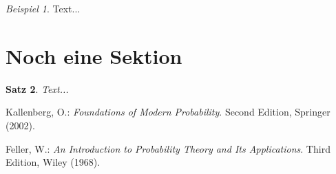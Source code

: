 \documentclass[11pt]{scrreprt}
\theoremstyle{plain}
\newtheorem{satz}{Satz}[chapter]
\theoremstyle{remark}
\newtheorem{bsp}[satz]{Beispiel}
\numberwithin{equation}{chapter}
\numberwithin{satz}{chapter}
\numberwithin{section}{chapter}
\begin{document}
\begin{bsp}
Text...
\end{bsp}

\section{Noch eine Sektion}
\begin{satz}
Text...
\end{satz}


\begin{thebibliography}{100}

Kallenberg, O.: {\em Foundations of Modern Probability}. Second Edition, Springer (2002).

Feller, W.:  {\em An Introduction to Probability Theory and Its Applications}. Third Edition, Wiley (1968).

\end{thebibliography}
\end{document}

